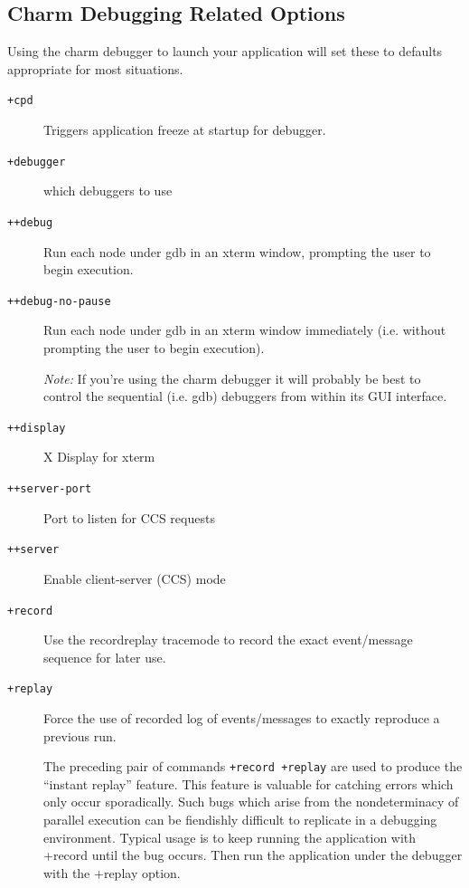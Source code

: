 \documentclass[10pt]{article}
\begin{document}

\subsection{Charm Debugging Related Options}

Using the charm debugger to launch your application will set these
to defaults appropriate for most situations.

\begin{description}

\item[{\tt +cpd}] Triggers application freeze at startup for debugger.

\item[{\tt +debugger}] which debuggers to use

\item[{\tt ++debug}] Run each node under gdb in an xterm window, prompting
the user to begin execution.

\item[{\tt ++debug-no-pause}] Run each node under gdb in an xterm window
immediately (i.e. without prompting the user to begin execution).

 \emph{ Note: } If you're using the charm debugger it will probably be
 best to control the sequential (i.e. gdb) debuggers from within its
 GUI interface.
 
\item[{\tt ++display}]          X Display for xterm

\item[{\tt ++server-port}]      Port to listen for CCS requests

\item[{\tt ++server}]           Enable client-server (CCS) mode

\item[{\tt +record}]           Use the recordreplay tracemode to record the exact event/message sequence for later use.  

\item[{\tt +replay}]           Force the use of recorded log of events/messages  to exactly reproduce a previous run.

  The preceding pair of commands {\tt +record +replay} are used to
  produce the ``instant replay'' feature.  This feature is valuable
  for catching errors which only occur sporadically.  Such bugs which
  arise from the nondeterminacy of parallel execution can be
  fiendishly difficult to replicate in a debugging environment.
  Typical usage is to keep running the application with +record until
  the bug occurs.  Then run the application under the debugger with
  the +replay option.

\end{description}
\end{document}

